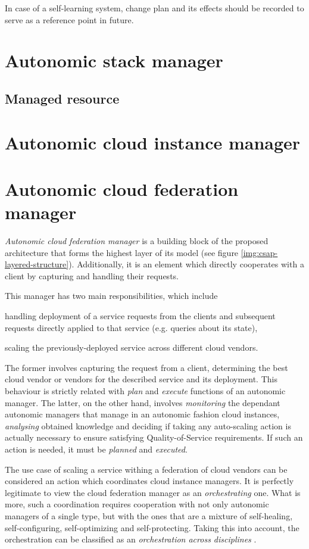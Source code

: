In case of a self-learning system, change plan and its effects should be recorded to serve as a reference point in future.

\section{Autonomic stack manager}
\subsection{Managed resource}


\section{Autonomic cloud instance manager}

\section{Autonomic cloud federation manager}
\emph{Autonomic cloud federation manager} is a building block of the proposed architecture that forms the highest layer of its model (see figure \ref{img:csap-layered-structure}). Additionally, it is an element which directly cooperates with a client by capturing and handling their requests.

This manager has two main responsibilities, which include
\begin{inparaenum}[1)]
\item handling deployment of a service requests from the clients and subsequent requests directly applied to that service (e.g. queries about its state), 
\item scaling the previously-deployed service across different cloud vendors.
\end{inparaenum}
The former involves capturing the request from a client, determining the best cloud vendor or vendors for the described service and its deployment. This behaviour is strictly related with \emph{plan} and \emph{execute} functions of an autonomic manager. The latter, on the other hand, involves \emph{monitoring} the dependant autonomic managers that manage in an autonomic fashion cloud instances, \emph{analysing} obtained knowledge and deciding if taking any auto-scaling action is actually necessary to ensure satisfying Quality-of-Service requirements. If such an action is needed, it must be \emph{planned} and \emph{executed}.

The use case of scaling a service withing a federation of cloud vendors can be considered an action which coordinates cloud instance managers. It is perfectly legitimate to view the cloud federation manager as an \emph{orchestrating} one. What is more, such a coordination requires cooperation with not only autonomic managers of a single type, but with the ones that are a mixture of self-healing, self-configuring, self-optimizing and self-protecting. Taking this into account, the orchestration can be classified as an \emph{orchestration across disciplines} \cite{IBM06}.

